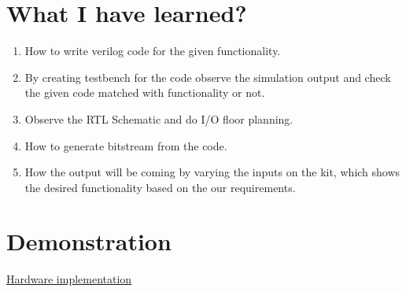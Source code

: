 \documentclass{article}
\begin{document}
\section{What I have learned?}
\begin{enumerate}
    \item  How to write verilog code for the given functionality.
    \item By creating testbench for the code observe the simulation output and check the given code matched with functionality or not.
    \item Observe the RTL Schematic and do I/O floor planning.
    \item How to generate bitstream from the code.
    \item How the output will be coming by varying the inputs on the kit, which shows the desired functionality based on the our requirements.
\end{enumerate}

\section{Demonstration}
\newline
\href{https://github.com/RajKohale/FPGAspeaks}{  Hardware implementation}
\end{document}
